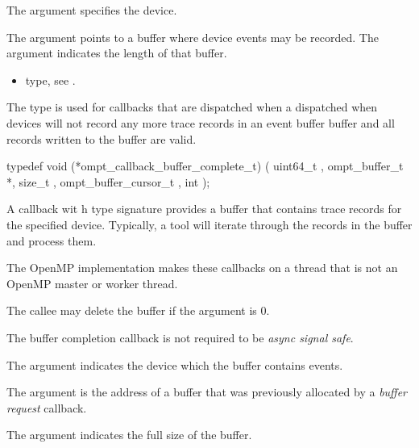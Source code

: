 \argdesc
The  argument specifies the device.

The  argument points to a buffer where device events may be 
recorded. The  argument indicates the length of that buffer.

\crossreferences
\begin{itemize}
\item {} type, see .
\end{itemize}



\label{sec:ompt_callback_buffer_complete_t}

\summary
The  type is used for callbacks that are
dispatched when a dispatched when devices will not record any more trace records
in an event buffer buffer and all records written to the buffer are valid.

\format
\begin{ccppspecific}
\begin{omptCallback}
typedef void (*ompt_callback_buffer_complete_t) (
  uint64_t ,
  ompt_buffer_t *,
  size_t ,
  ompt_buffer_cursor_t ,
  int 
);
\end{omptCallback}
\end{ccppspecific}

\descr
A callback wit h type signature  provides 
a buffer that contains trace records for the specified device. Typically, a tool 
will iterate through the records in the buffer and process them.

The OpenMP implementation makes these callbacks on a thread that is not an 
OpenMP master or worker thread.

The callee may delete the buffer if the  argument is 0.

The buffer completion callback is not required to be \emph{async signal safe}.

\argdesc
The  argument indicates the device which the buffer contains events.

The  argument is the address of a buffer that was previously
allocated by a \emph{buffer request} callback.

The  argument indicates the full size of the buffer.

